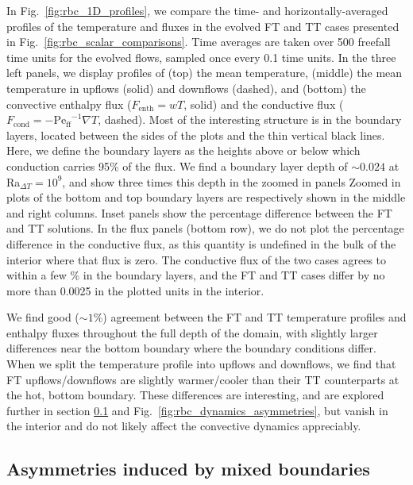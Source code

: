 \documentclass[aps, pre, onecolumn, nofootinbib, notitlepage, groupedaddress, amsfonts, amssymb, amsmath, longbibliography, superscriptaddress]{revtex4-1}
\newcommand{\grad}{\ensuremath{\nabla}}
\newcommand{\Peff}{\ensuremath{\text{Pe}_{\text{ff}}}}
\newcommand{\ea}[1]{{\color{red} #1}}
\begin{document}
In Fig.~\ref{fig:rbc_1D_profiles}, we compare the time- and horizontally-averaged profiles of the temperature and fluxes in the evolved FT and TT cases presented in Fig.~\ref{fig:rbc_scalar_comparisons}.
Time averages are taken over 500 freefall time units for the \ea{evolved flows}, sampled once every 0.1 time units.
In the three left panels, we display profiles of (top) the mean temperature, (middle) the mean temperature in upflows (solid) and downflows (dashed), and (bottom) the convective enthalpy flux ($F_{\text{enth}} = wT$, solid) and the conductive flux ($F_{\text{cond}} = -\Peff^{-1}\grad T$, dashed).
Most of the interesting structure is in the boundary layers, located between the sides of the plots and the thin vertical black lines.
\ea{Here, we define the boundary layers as the heights above or below which conduction carries 95\% of the flux.
We find a boundary layer depth of $\sim 0.024$ at Ra$_{\Delta T} = 10^9$, and show three times this depth in the zoomed in panels}
Zoomed in plots of the bottom and top boundary layers are respectively shown in the middle and right columns.
Inset panels show the percentage difference between the FT and TT solutions.
In the flux panels (bottom row), we do not plot the percentage difference in the conductive flux, as this quantity is undefined in the bulk of the interior where that flux is zero.
The conductive flux of the two cases agrees to within a few \% in the boundary layers, and the \ea{FT and TT cases differ by no more than 0.0025 in the plotted units} in the interior. 

We find good ($\sim 1\%$) agreement between the FT and TT temperature profiles and enthalpy fluxes throughout the full depth of the domain, with slightly larger differences near the bottom boundary where the boundary conditions differ.
When we split the temperature profile into upflows and downflows, we find that FT upflows/downflows are slightly warmer/cooler than their TT counterparts at the hot, bottom boundary.
These differences are interesting, and are explored further in section \ref{sec:asymmetries} and Fig.~\ref{fig:rbc_dynamics_asymmetries}, but vanish in the interior and do not likely affect the convective dynamics appreciably.



\subsection{Asymmetries induced by mixed boundaries}
\label{sec:asymmetries}
\end{document}
